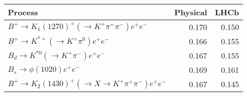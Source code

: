 \begin{tabular}{lrr}
\toprule
Process & Physical & LHCb \\
\midrule
$B^+\to K_1(1270)^+(\to K^+\pi^+\pi^-)e^+e^-$ & 0.170 & 0.150 \\
$B^+\to K^{*+}(\to K^+\pi^0)e^+e^-$ & 0.166 & 0.155 \\
$B_d\to K^{*0}(\to K^+\pi^-)e^+e^-$ & 0.167 & 0.155 \\
$B_s\to \phi(1020)e^+e^-$ & 0.169 & 0.161 \\
$B^+\to K_2(1430)^+(\to X \to K^+\pi^+\pi^-)e^+e^-$ & 0.167 & 0.145 \\
\bottomrule
\end{tabular}

